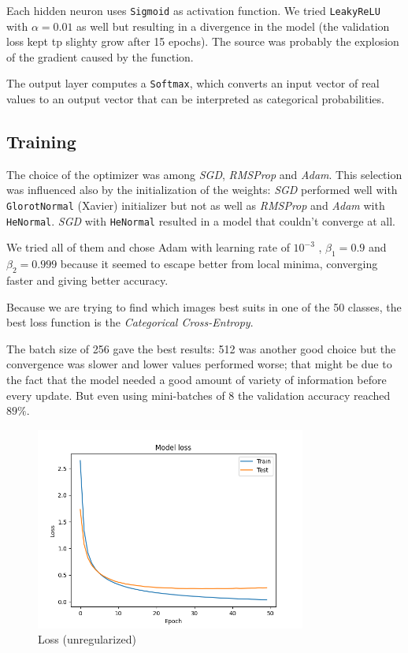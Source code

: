 \documentclass[compsoc]{IEEEtran}
\begin{document}
Each hidden neuron uses \texttt{Sigmoid} as activation function. We tried \texttt{LeakyReLU} with $\alpha=0.01$ as well but resulting in a divergence in the model (the validation loss kept tp slighty grow after 15 epochs). The source was probably the explosion of the gradient caused by the function.  \par 
The output layer computes a \texttt{Softmax}, which converts an input vector of real values to an output vector that can be interpreted as categorical probabilities.

\subsection{Training}
The choice of the optimizer was among \emph{SGD}, \emph{RMSProp} and
\emph{Adam}. This selection was influenced also by the initialization of the weights: 
\emph{SGD} performed well with \texttt{GlorotNormal} (Xavier) initializer but not as well as \emph{RMSProp} and
\emph{Adam} with \texttt{HeNormal}. \emph{SGD} with \texttt{HeNormal} resulted in a model that couldn't converge at all.

We tried all of them and chose Adam with learning
rate of $10^{-3}$ , $\beta_1 = 0.9$ and $\beta_2 = 0.999$ because it seemed to
escape better from local minima, converging faster and giving
better accuracy. \par 
Because we are trying to find which images best suits in one of the 50 classes, the best loss function is the \emph{Categorical Cross-Entropy}.\par
The batch size of 256 gave the best results: 512 was another good choice but the convergence was slower and lower values performed worse; that might be
due to the fact that the model needed a good amount of variety of information before every update. But even using mini-batches of 8 the validation accuracy
reached $89\%$.




\begin{figure}[ht!]
\centering                                                                        
\includegraphics[width=3.5in]{../images/noreg/loss-sigmoid-categorical_crossentropy-Adam-50-256.png}
\captionsetup{justification=centering}                                                                                                                                   
\caption{Loss (unregularized)}
\label{fig:loss1}                                                                                                                                                           
\end{figure}
\end{document}
